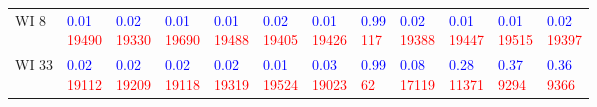 \begin{tabular}{llllllllllll}
WI 8   &  \makecell{\textcolor{blue}{0.01} \\ \textcolor{red}{19490}} &  \makecell{\textcolor{blue}{0.02} \\ \textcolor{red}{19330}} &  \makecell{\textcolor{blue}{0.01} \\ \textcolor{red}{19690}} &  \makecell{\textcolor{blue}{0.01} \\ \textcolor{red}{19488}} &  \makecell{\textcolor{blue}{0.02} \\ \textcolor{red}{19405}} &  \makecell{\textcolor{blue}{0.01} \\ \textcolor{red}{19426}} &  \makecell{\textcolor{blue}{0.99} \\ \textcolor{red}{117}} &  \makecell{\textcolor{blue}{0.02} \\ \textcolor{red}{19388}} &  \makecell{\textcolor{blue}{0.01} \\ \textcolor{red}{19447}} &  \makecell{\textcolor{blue}{0.01} \\ \textcolor{red}{19515}} &  \makecell{\textcolor{blue}{0.02} \\ \textcolor{red}{19397}} \\
WI 33  &  \makecell{\textcolor{blue}{0.02} \\ \textcolor{red}{19112}} &  \makecell{\textcolor{blue}{0.02} \\ \textcolor{red}{19209}} &  \makecell{\textcolor{blue}{0.02} \\ \textcolor{red}{19118}} &  \makecell{\textcolor{blue}{0.02} \\ \textcolor{red}{19319}} &  \makecell{\textcolor{blue}{0.01} \\ \textcolor{red}{19524}} &  \makecell{\textcolor{blue}{0.03} \\ \textcolor{red}{19023}} &   \makecell{\textcolor{blue}{0.99} \\ \textcolor{red}{62}} &  \makecell{\textcolor{blue}{0.08} \\ \textcolor{red}{17119}} &  \makecell{\textcolor{blue}{0.28} \\ \textcolor{red}{11371}} &   \makecell{\textcolor{blue}{0.37} \\ \textcolor{red}{9294}} &   \makecell{\textcolor{blue}{0.36} \\ \textcolor{red}{9366}} \\

\end{tabular}
